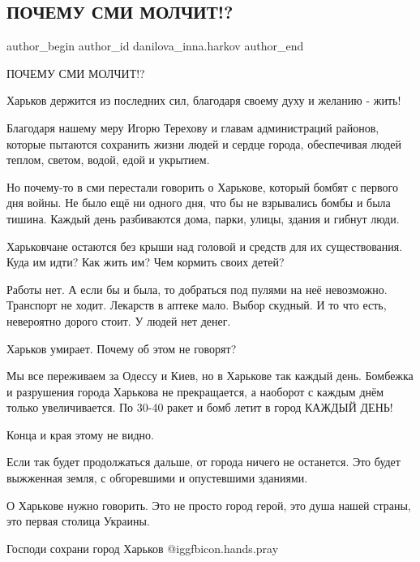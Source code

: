  
 
 
 
 
 
\subsection{ПОЧЕМУ СМИ МОЛЧИТ!?}
\label{sec:29_04_2022.fb.danilova_inna.harkov.1.smi_molchit}
 
\ifcmt
 author_begin
   author_id danilova_inna.harkov
 author_end
\fi


ПОЧЕМУ СМИ МОЛЧИТ!?

Харьков держится из последних сил, благодаря своему духу и желанию - жить! 

Благодаря нашему меру Игорю Терехову и главам администраций районов, которые
пытаются сохранить жизни людей и сердце города, обеспечивая людей теплом,
светом, водой, едой и укрытием. 


Но почему-то в сми перестали говорить о Харькове, который бомбят с первого дня
войны. Не было ещё ни одного дня, что бы не взрывались бомбы и была тишина.
Каждый день разбиваются дома, парки, улицы, здания и гибнут люди. 

Харьковчане остаются без крыши над головой и средств для их существования. Куда
им идти? Как жить им? Чем кормить своих детей? 

Работы нет. А если бы и была, то добраться под пулями на неё невозможно.
Транспорт не ходит. Лекарств в аптеке мало. Выбор скудный. И то что есть,
невероятно дорого стоит. У людей нет денег. 

Харьков умирает. Почему об этом не говорят? 

Мы все переживаем за Одессу и Киев, но в Харькове так каждый день. Бомбежка и
разрушения города Харькова не прекращается, а наоборот с каждым днём только
увеличивается. По 30-40 ракет и бомб летит в город КАЖДЫЙ ДЕНЬ! 

Конца и края этому не видно. 

Если так будет продолжаться дальше, от города ничего не останется. Это будет
выжженная земля, с обгоревшими и опустевшими зданиями. 

О Харькове нужно говорить. Это не просто город герой, это душа нашей страны,
это первая столица Украины. 

Господи сохрани город Харьков @igg{fbicon.hands.pray}
